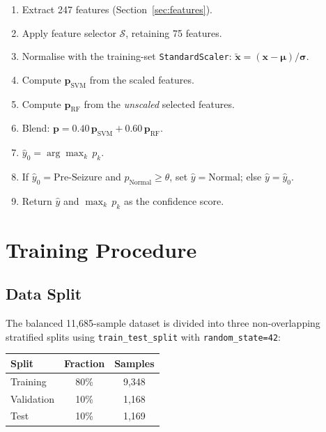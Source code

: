 \documentclass[12pt, a4paper]{report}
\begin{document}
\begin{enumerate}[label=\arabic*.]
  \item Extract 247 features (Section~\ref{sec:features}).
  \item Apply feature selector $\mathcal{S}$, retaining 75 features.
  \item Normalise with the training-set \texttt{StandardScaler}:
        $\tilde{\mathbf{x}} = (\mathbf{x} - \boldsymbol{\mu}) / \boldsymbol{\sigma}$.
  \item Compute $\mathbf{p}_{\text{SVM}}$ from the scaled features.
  \item Compute $\mathbf{p}_{\text{RF}}$ from the \emph{unscaled} selected features.
  \item Blend: $\mathbf{p} = 0.40\,\mathbf{p}_{\text{SVM}} + 0.60\,\mathbf{p}_{\text{RF}}$.
  \item $\hat{y}_0 = \arg\max_k\, p_k$.
  \item If $\hat{y}_0 = \text{Pre-Seizure}$ and $p_{\text{Normal}} \geq \theta$,
        set $\hat{y} = \text{Normal}$; else $\hat{y} = \hat{y}_0$.
  \item Return $\hat{y}$ and $\max_k\, p_k$ as the confidence score.
\end{enumerate}

\section{Training Procedure}

\subsection{Data Split}

The balanced 11{,}685-sample dataset is divided into three non-overlapping
stratified splits using \texttt{train\_test\_split} with \texttt{random\_state=42}:

\begin{center}
  \begin{tabular}{lcc}
    \toprule
    \textbf{Split} & \textbf{Fraction} & \textbf{Samples} \\
    \midrule
    Training       & 80\%              & 9{,}348 \\
    Validation     & 10\%              & 1{,}168 \\
    Test           & 10\%              & 1{,}169 \\
    \bottomrule
  \end{tabular}
\end{center}
\end{document}
